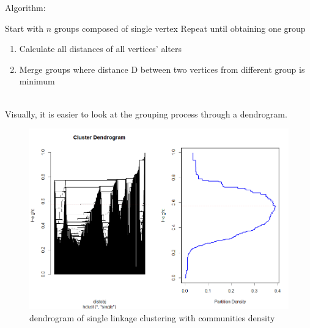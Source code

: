 \documentclass[11pt]{article}       %
\begin{document}
Algorithm:

\begin{center}
\setlength{\fboxsep}{3pt}
\fbox
{\parbox{13cm}{
Start with $n$ groups composed of single vertex \newline
Repeat until obtaining one group
\begin{enumerate}
\item Calculate all distances of all vertices' alters
\item Merge groups where distance D between two vertices from different group is minimum
\end{enumerate}
}}
\end{center}

\\
Visually, it is easier to look at the grouping process through a dendrogram.

\begin{figure}[H]
\centering
  \includegraphics[width=\linewidth]{dendrogramseuil.PNG}
    \caption{dendrogram of single linkage clustering with communities density}
\end{figure}
\end{document}
